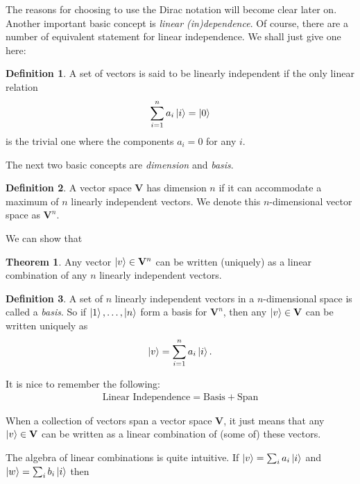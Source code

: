 \documentclass{book}
\theoremstyle{definition}
\newtheorem{defn}{Definition}[section]
\newtheorem{thm}{Theorem}[section]
\newcommand{\V}{\mathbf{V}}
\begin{document}
The reasons for choosing to use the Dirac notation will become clear later on. Another important basic concept is \textit{linear (in)dependence}. Of course, there are a number of equivalent statement for linear independence. We shall just give one here:

\begin{defn}
	A set of vectors is said to be linearly independent if the only linear relation 
	\begin{align}
	\sum^n_{i=1}a_i\ket{i} = \ket{0}
	\end{align}
	is the trivial one where the components $a_i = 0$ for any $i$. 
\end{defn}



The next two basic concepts are \textit{dimension} and \textit{basis}. 

\begin{defn}
	A vector space $\V$ has dimension $n$ if it can accommodate a maximum of $n$ linearly independent vectors. We denote this $n$-dimensional vector space as $\V^n$.
\end{defn}

We can show that 

\begin{thm}
	Any vector $\ket{v} \in \V^n$ can be written (uniquely) as a linear combination of any $n$ linearly independent vectors.  
\end{thm}


\begin{defn}
	A set of $n$ linearly independent vectors in a $n$-dimensional space is called a \textit{basis}. So if $\ket{1},\dots,\ket{n}$ form a basis for $\V^n$, then any $\ket{v}\in \V$ can be written uniquely as
	\begin{align}
	\ket{v} = \sum^n_{i=1}a_i\ket{i}.
	\end{align}
\end{defn}

It is nice to remember the following:
\begin{align}
\boxed{\text{Linear Independence} = \text{Basis} + \text{Span}}
\end{align}

When a collection of vectors span a vector space $\V$, it just means that any $\ket{v} \in \V$ can be written as a linear combination of (some of) these vectors. 


The algebra of linear combinations is quite intuitive. If $\ket{v} = \sum_i a_i\ket{i}$ and $\ket{w} = \sum_i b_i\ket{i}$ then 
\end{document}
